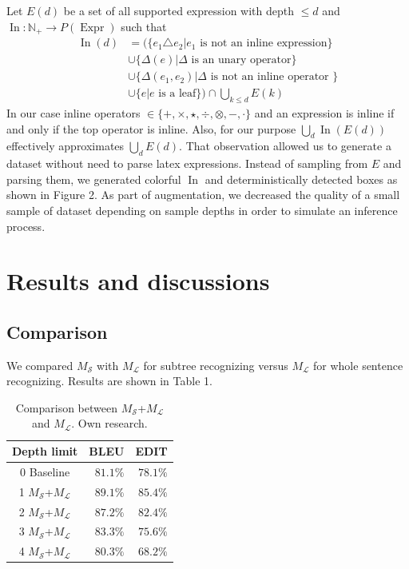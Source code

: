 \documentclass{sciposter}
\begin{document}
\begin{multicols}{3}
Let $E(d)$ be a set of all supported expression with depth $\le d$ and $\operatorname{In}: \mathbb N_+ \rightarrow P(\operatorname{Expr})$ such that
\nonumber
\begin{equation}
\begin{split}
\operatorname{In}(d) & = ( \{ e_1 \triangle e_2 | e_1 \text{ is not an inline expression} \} \\
& \cup  \{\Delta(e) | \Delta \text{ is an unary operator} \} \\
& \cup  \{\Delta(e_1,e_2) | \Delta \text{ is not an inline operator }\} \\
& \cup \{ e | e \text{ is a leaf} \} ) \cap \bigcup_{k \le d} E(k)
\end{split}
\end{equation}
In our case inline operators $\in \{+, \times, \star, \div, \otimes, -, \cdot \}$ and an expression is inline if and only if the top operator is inline. Also, for our purpose  $\bigcup_d \operatorname{In}\left(E(d)\right)$ effectively approximates $\bigcup_d E(d)$. That observation allowed us to generate a dataset without need to parse latex expressions. Instead of sampling from $E$ and parsing them, we generated colorful $\operatorname{In}$ and deterministically detected boxes as shown in Figure 2. As part of augmentation, we decreased the quality of a small sample of dataset depending on sample depths in order to simulate an inference process.

\section{Results and discussions}

\subsection{Comparison}
We compared $M_{\mathcal{S}}$ with $M_{\mathcal{L}}$ for subtree recognizing versus $M_{\mathcal{L}}$ for whole sentence recognizing. Results are shown in Table 1.

\begin{table}[ht] 
\caption{Comparison between $M_{\mathcal{S}}$+$M_{\mathcal{L}}$ and $M_{\mathcal{L}}$.  Own research.} %
\centering %
\begin{tabular}{c| rr  } %
\hline\hline %
Depth limit &BLEU&EDIT\\ [0.25ex] 
\hline   
0 Baseline & $81.1\%$ & $78.1\%$  \\  
1 $M_{\mathcal{S}}$+$M_{\mathcal{L}}$ & $\bm{89.1\%}$ & $\bm{85.4\%}$  \\
2 $M_{\mathcal{S}}$+$M_{\mathcal{L}}$ & $\bm{87.2\%}$ & $\bm{82.4\%}$  \\  
3 $M_{\mathcal{S}}$+$M_{\mathcal{L}}$ & $\bm{83.3\%}$ & $75.6\%$  \\  
4 $M_{\mathcal{S}}$+$M_{\mathcal{L}}$ & $80.3\%$ & $68.2\%$  \\  


\end{tabular}
\end{table}
\end{multicols}
\end{document}
